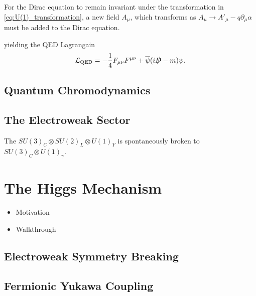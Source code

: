 For the Dirac equation to remain invariant under the transformation in \cref{eq:U(1)_transformation}, a new field $A_\mu$, which transforms as $A_\mu \rightarrow A'_\mu - q \partial_\mu \alpha$ must be added to the Dirac equation.

yielding the QED Lagrangain
\begin{equation}\label{eq:qed_lagrangian}
  \mathcal{L}_{\textnormal{QED}} = -\frac{1}{4} F_{\mu\nu} F^{\mu\nu} + \overline{\psi} (i \slashed{D}  - m )\psi.
\end{equation}



\subsection{Quantum Chromodynamics}\label{sec:qcd}

\subsection{The Electroweak Sector}\label{sec:ew_sector}

The $SU(3)_C \otimes SU(2)_L \otimes U(1)_Y$ is spontaneously broken to $SU(3)_C \otimes U(1)_\gamma$.

\section{The Higgs Mechanism}\label{sec:sm_higgs}

\begin{itemize}
  \item Motivation
  \item Walkthrough
\end{itemize}

\subsection{Electroweak Symmetry Breaking}\label{sec:ew_symmetry_breaking}
\subsection{Fermionic Yukawa Coupling}\label{sec:higgs_yukawa_coupling}

